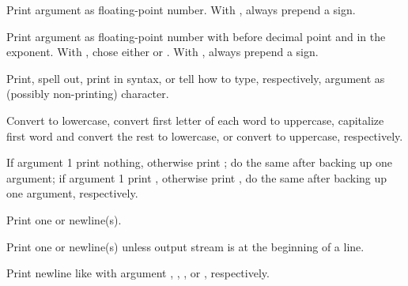 \begin{LIST}{1cm}
\begin{LIST}{.5cm}
    {
    Print argument as floating-point number. With , always prepend a sign.
  }

    {
    Print argument as floating-point number with 
    before decimal point and  in the
    exponent. With , chose either  or . With , always prepend a sign.
  }

    {
    Print, spell out, print in \kwd{\#$\backslash$} syntax, or tell how to type, respectively, argument as
    (possibly non-printing) character.
  }

    {
    Convert to lowercase, convert first letter of each word to
    uppercase, capitalize first word and convert
    the rest to lowercase, or convert to uppercase, respectively.
  }

    {
    If argument  1 print nothing, otherwise print ;
    do the same after backing up one argument; if argument  1
    print , otherwise print , do the same after
    backing up one argument, respectively. 
  }

    {
    Print one or  newline(s).
  }

    {
    Print one or  newline(s) unless output stream is at the
    beginning of a line.
  }

    {
    Print newline like  with argument
    , , , or , respectively.
  }


\end{LIST}
\end{LIST}
